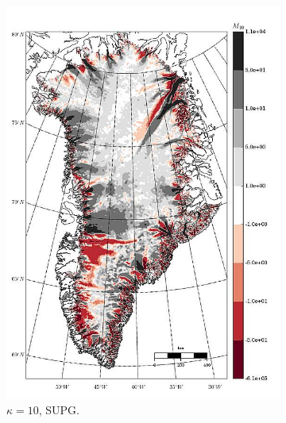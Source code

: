 \begin{figure}
\begin{subfigure}[b]{0.25\linewidth}
    \includegraphics[width=\linewidth]{images/balance_velocity/greenland/d_U_ob/misfit_5H_kappa_10_SUPG.jpg}
  \caption{$\kappa = 10$, SUPG.}
  \label{greenland_bv_image_d_U_ob_kappa_10_SUPG_misfit}
  \end{subfigure}
  \begin{subfigure}[b]{0.25\linewidth}

\end{subfigure}
\end{figure}
